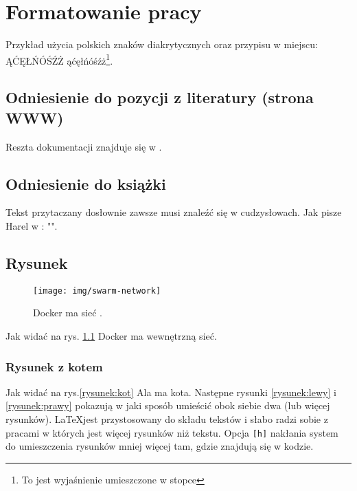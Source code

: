 
\chapter{Formatowanie pracy}

Przykład użycia polskich znaków diakrytycznych oraz przypisu w miejscu: ĄĆĘŁŃÓŚŹŻ ąćęłńóśźż\footnote{To jest wyjaśnienie umieszczone w stopce}. \lipsum[1]

\section{Odniesienie do pozycji z literatury (strona WWW)}

Reszta dokumentacji znajduje się w \cite{docker_compose_reference}. \lipsum[3]

\section{Odniesienie do książki}

Tekst przytaczany dosłownie zawsze musi znaleźć się w cudzysłowach. Jak pisze Harel w \cite{harel_rzecz_2008}: "\lipsum[1]". 

\section{Rysunek}

\begin{figure}
\centering\texttt{[image: img/swarm-network]}
\caption{Docker ma sieć \cite{docker_compose_reference}.}  \label{rys:network}%
\end{figure}

Jak widać na rys. \ref{rys:network} Docker ma wewnętrzną sieć. \lipsum[1]


\subsection{Rysunek z kotem}

Jak widać na rys.\ref{rysunek:kot} Ala ma kota. Następne rysunki \ref{rysunek:lewy} i \ref{rysunek:prawy} pokazują w jaki sposób umieścić obok siebie dwa (lub więcej rysunków). \LaTeX jest przystosowany do składu tekstów i słabo radzi sobie z pracami w których jest więcej rysunków niż tekstu. Opcja \verb+[h]+ nakłania system do umieszczenia rysunków mniej więcej tam, gdzie znajdują się w kodzie. \lipsum[9-10] 

